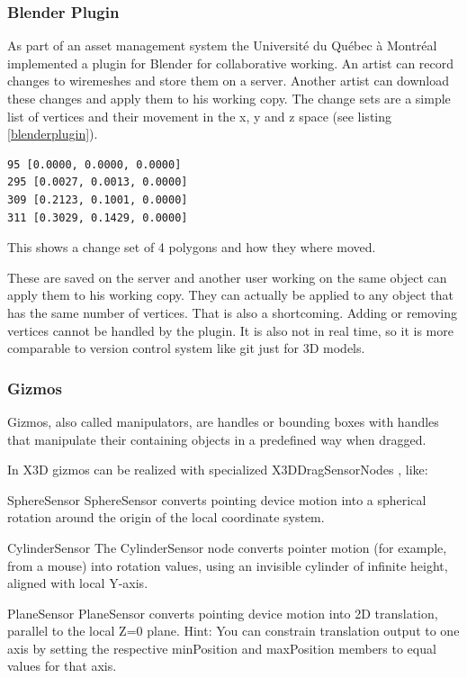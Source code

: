 \subsubsection{Blender Plugin}
\label{blender-plugin}

As part of an asset management system the Université du Québec à
Montréal implemented a plugin for Blender for collaborative working. An
artist can record changes to wiremeshes and store them on a server.
Another artist can download these changes and apply them to his working
copy. The change sets are a simple list of vertices and their movement in the
x, y and z space (see listing \ref{blenderplugin}). \cite{LCR07}

\begin{listing}
  \begin{verbatim}
95 [0.0000, 0.0000, 0.0000]
295 [0.0027, 0.0013, 0.0000]
309 [0.2123, 0.1001, 0.0000]
311 [0.3029, 0.1429, 0.0000]
  \end{verbatim}
  \caption{This shows a change set of 4 polygons and how they where moved.}
  \label{blenderplugin}
\end{listing}

These are saved on the server and another user working on the same
object can apply them to his working copy. They can actually be applied
to any object that has the same number of vertices. That is also a
shortcoming. Adding or removing vertices cannot be handled by the
plugin. It is also not in real time, so it is more comparable to version
control system like \gls{git} just for \gls{3D} models.

\subsubsection{Gizmos}\label{gizmos}

Gizmos, also called manipulators, are handles or bounding boxes with
handles that manipulate their containing objects in a predefined way when
dragged. \cite{wikigizmo}

In \gls{X3D} gizmos can be realized with specialized X3DDragSensorNodes \cite{x3ddragsensornode}, like:

\begin{description*}
\item[SphereSensor]
  SphereSensor converts pointing device motion into a spherical rotation around the origin of the local coordinate system. \cite{spheresensor}
\item[CylinderSensor]
  The CylinderSensor node converts pointer motion (for example, from a mouse) into rotation values, using an invisible cylinder of infinite height, aligned with local Y-axis. \cite{cylindersensor}
\item[PlaneSensor]
  PlaneSensor converts pointing device motion into 2D translation, parallel to the local Z=0 plane. Hint: You can constrain translation output to one axis by setting the respective minPosition and maxPosition members to equal values for that axis. \cite{planesensor}
\end{description*}


